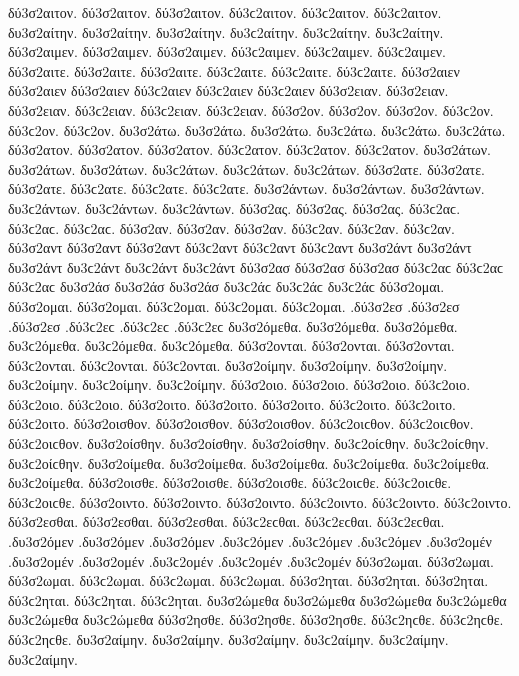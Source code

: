 {δύ3σ2αιτον. δύ3σ2αιτον. δύ3σ2αιτον. δύ3ϲ2αιτον. δύ3ϲ2αιτον. δύ3ϲ2αιτον. 
δυ3σ2αίτην. δυ3σ2αίτην. δυ3σ2αίτην. δυ3ϲ2αίτην. δυ3ϲ2αίτην. δυ3ϲ2αίτην. 
δύ3σ2αιμεν. δύ3σ2αιμεν. δύ3σ2αιμεν. δύ3ϲ2αιμεν. δύ3ϲ2αιμεν. δύ3ϲ2αιμεν. 
δύ3σ2αιτε. δύ3σ2αιτε. δύ3σ2αιτε. δύ3ϲ2αιτε. δύ3ϲ2αιτε. δύ3ϲ2αιτε. 
δύ3σ2αιεν δύ3σ2αιεν δύ3σ2αιεν δύ3ϲ2αιεν δύ3ϲ2αιεν δύ3ϲ2αιεν δύ3σ2ειαν. δύ3σ2ειαν. δύ3σ2ειαν. δύ3ϲ2ειαν. δύ3ϲ2ειαν. δύ3ϲ2ειαν. 
δύ3σ2ον. δύ3σ2ον. δύ3σ2ον. δύ3ϲ2ον. δύ3ϲ2ον. δύ3ϲ2ον. 
δυ3σ2άτω. δυ3σ2άτω. δυ3σ2άτω. δυ3ϲ2άτω. δυ3ϲ2άτω. δυ3ϲ2άτω. 
δύ3σ2ατον. δύ3σ2ατον. δύ3σ2ατον. δύ3ϲ2ατον. δύ3ϲ2ατον. δύ3ϲ2ατον. 
δυ3σ2άτων. δυ3σ2άτων. δυ3σ2άτων. δυ3ϲ2άτων. δυ3ϲ2άτων. δυ3ϲ2άτων. 
δύ3σ2ατε. δύ3σ2ατε. δύ3σ2ατε. δύ3ϲ2ατε. δύ3ϲ2ατε. δύ3ϲ2ατε. 
δυ3σ2άντων. δυ3σ2άντων. δυ3σ2άντων. δυ3ϲ2άντων. δυ3ϲ2άντων. δυ3ϲ2άντων. 
δύ3σ2ας. δύ3σ2ας. δύ3σ2ας. δύ3ϲ2αϲ. δύ3ϲ2αϲ. δύ3ϲ2αϲ. δύ3σ2αν. δύ3σ2αν. δύ3σ2αν. δύ3ϲ2αν. δύ3ϲ2αν. δύ3ϲ2αν. δύ3σ2αντ δύ3σ2αντ δύ3σ2αντ δύ3ϲ2αντ δύ3ϲ2αντ δύ3ϲ2αντ δυ3σ2άντ δυ3σ2άντ δυ3σ2άντ δυ3ϲ2άντ δυ3ϲ2άντ δυ3ϲ2άντ 
δύ3σ2ασ δύ3σ2ασ δύ3σ2ασ δύ3ϲ2αϲ δύ3ϲ2αϲ δύ3ϲ2αϲ δυ3σ2άσ δυ3σ2άσ δυ3σ2άσ δυ3ϲ2άϲ δυ3ϲ2άϲ δυ3ϲ2άϲ 
δύ3σ2ομαι. δύ3σ2ομαι. δύ3σ2ομαι. δύ3ϲ2ομαι. δύ3ϲ2ομαι. δύ3ϲ2ομαι. 
.δύ3σ2εσ .δύ3σ2εσ .δύ3σ2εσ .δύ3ϲ2εϲ .δύ3ϲ2εϲ .δύ3ϲ2εϲ 
δυ3σ2όμεθα. δυ3σ2όμεθα. δυ3σ2όμεθα. δυ3ϲ2όμεθα. δυ3ϲ2όμεθα. δυ3ϲ2όμεθα. 
δύ3σ2ονται. δύ3σ2ονται. δύ3σ2ονται. δύ3ϲ2ονται. δύ3ϲ2ονται. δύ3ϲ2ονται. 
δυ3σ2οίμην. δυ3σ2οίμην. δυ3σ2οίμην. δυ3ϲ2οίμην. δυ3ϲ2οίμην. δυ3ϲ2οίμην. 
δύ3σ2οιο. δύ3σ2οιο. δύ3σ2οιο. δύ3ϲ2οιο. δύ3ϲ2οιο. δύ3ϲ2οιο. 
δύ3σ2οιτο. δύ3σ2οιτο. δύ3σ2οιτο. δύ3ϲ2οιτο. δύ3ϲ2οιτο. δύ3ϲ2οιτο. 
δύ3σ2οισθον. δύ3σ2οισθον. δύ3σ2οισθον. δύ3ϲ2οιϲθον. δύ3ϲ2οιϲθον. δύ3ϲ2οιϲθον. 
δυ3σ2οίσθην. δυ3σ2οίσθην. δυ3σ2οίσθην. δυ3ϲ2οίϲθην. δυ3ϲ2οίϲθην. δυ3ϲ2οίϲθην. 
δυ3σ2οίμεθα. δυ3σ2οίμεθα. δυ3σ2οίμεθα. δυ3ϲ2οίμεθα. δυ3ϲ2οίμεθα. δυ3ϲ2οίμεθα. 
δύ3σ2οισθε. δύ3σ2οισθε. δύ3σ2οισθε. δύ3ϲ2οιϲθε. δύ3ϲ2οιϲθε. δύ3ϲ2οιϲθε. 
δύ3σ2οιντο. δύ3σ2οιντο. δύ3σ2οιντο. δύ3ϲ2οιντο. δύ3ϲ2οιντο. δύ3ϲ2οιντο. 
δύ3σ2εσθαι. δύ3σ2εσθαι. δύ3σ2εσθαι. δύ3ϲ2εϲθαι. δύ3ϲ2εϲθαι. δύ3ϲ2εϲθαι. 
.δυ3σ2όμεν .δυ3σ2όμεν .δυ3σ2όμεν .δυ3ϲ2όμεν .δυ3ϲ2όμεν .δυ3ϲ2όμεν   %
.δυ3σ2ομέν .δυ3σ2ομέν .δυ3σ2ομέν .δυ3ϲ2ομέν .δυ3ϲ2ομέν .δυ3ϲ2ομέν 
δύ3σ2ωμαι. δύ3σ2ωμαι. δύ3σ2ωμαι. δύ3ϲ2ωμαι. δύ3ϲ2ωμαι. δύ3ϲ2ωμαι. 
δύ3σ2ηται. δύ3σ2ηται. δύ3σ2ηται. δύ3ϲ2ηται. δύ3ϲ2ηται. δύ3ϲ2ηται. 
δυ3σ2ώμεθα δυ3σ2ώμεθα δυ3σ2ώμεθα δυ3ϲ2ώμεθα δυ3ϲ2ώμεθα δυ3ϲ2ώμεθα 
δύ3σ2ησθε. δύ3σ2ησθε. δύ3σ2ησθε. δύ3ϲ2ηϲθε. δύ3ϲ2ηϲθε. δύ3ϲ2ηϲθε. 
δυ3σ2αίμην. δυ3σ2αίμην. δυ3σ2αίμην. δυ3ϲ2αίμην. δυ3ϲ2αίμην. δυ3ϲ2αίμην. 
}
